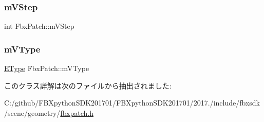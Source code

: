 \mbox{\label{class_fbx_patch_abeba80f7ee47a35509535ecd2edaf826}} 
\subsubsection{\texorpdfstring{m\+V\+Step}{mVStep}}
{\footnotesize\ttfamily int Fbx\+Patch\+::m\+V\+Step\hspace{0.3cm}{\ttfamily [protected]}}

\mbox{\label{class_fbx_patch_aa0e38cb994ef8741fbb163ca587cb2d6}} 
\subsubsection{\texorpdfstring{m\+V\+Type}{mVType}}
{\footnotesize\ttfamily \hyperlink{class_fbx_patch_ad669936e6b844a7a15fa30ec7c183fbb}{E\+Type} Fbx\+Patch\+::m\+V\+Type\hspace{0.3cm}{\ttfamily [protected]}}



このクラス詳解は次のファイルから抽出されました\+:\begin{DoxyCompactItemize}
\item 
C\+:/github/\+F\+B\+Xpython\+S\+D\+K201701/\+F\+B\+Xpython\+S\+D\+K201701/2017./include/fbxsdk/scene/geometry/\hyperlink{fbxpatch_8h}{fbxpatch.\+h}\end{DoxyCompactItemize}

